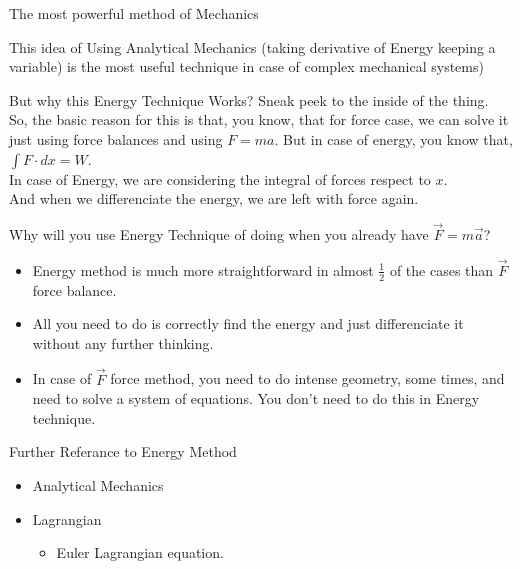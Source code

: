 \documentclass[9pt]{memoir}
\newenvironment{myitemize}{\begin{itemize}}{\end{itemize}}
\newcommand{\id}[1]{ \begin{idea} #1 \end{idea} }
\begin{document}
\begin{frame}
    {The most powerful method of Mechanics}
    \id{This idea of Using Analytical Mechanics (taking derivative of Energy keeping a variable) is the most useful technique in case of complex mechanical systems)}
\end{frame}



\begin{frame}
    {But why this Energy Technique Works?}
    Sneak peek to the inside of the thing. 
    \\
    So, the basic reason for this is that, you know, that for force case, we can solve it just using force balances and using $F=ma$. But in case of energy, 
    you know that, $\int F \cdot dx = W$. 
    \\
    In case of Energy, we are considering the integral of forces respect to $x$. 
    \\
    And when we differenciate the energy, we are left with force again. 
    
\end{frame}
\begin{frame}
    {Why will you use Energy Technique of doing when you already have $\vec F = m \vec a$?
    }
    \begin{itemize}
        \item Energy method is much more straightforward in almost $\frac{1}{2}$ of the cases than $\vec F$ force balance. 
        \item All you need to do is correctly find the energy and just differenciate it without any further thinking. 
        \item In case of $\vec F$ force method, you need to do intense geometry, some times, and need to solve a system of equations. 
            You don't need to do this in Energy technique.
    \end{itemize}
\end{frame}
 
\begin{frame}
    {Further Referance to Energy Method}
    \begin{myitemize}
    \item Analytical Mechanics 
    \item Lagrangian 
        \begin{itemize}
            \item Euler Lagrangian equation.
        \end{itemize}
    \end{myitemize}
    
\end{frame}
\end{document}
